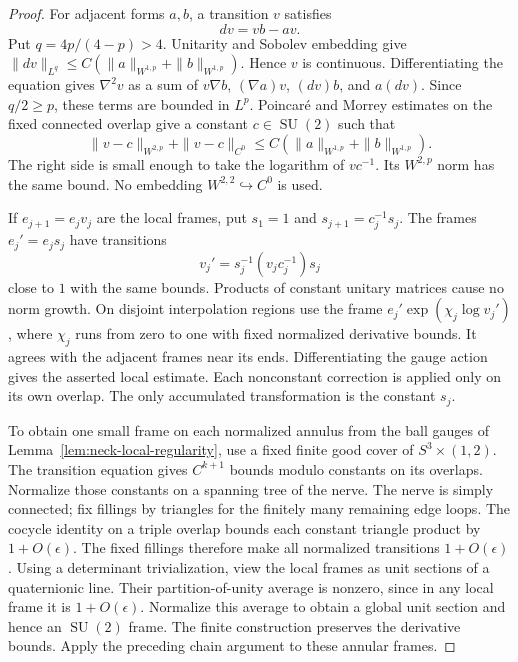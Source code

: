 \documentclass[11pt]{amsart}
\theoremstyle{definition}
\theoremstyle{remark}
\theoremstyle{plain}
\newcommand{\SU}{\operatorname{SU}}
\begin{document}
\begin{proof}
For adjacent forms $a,b$, a transition $v$ satisfies
\begin{equation}\label{eq:annular-transition-equation}
 dv=vb-av.
\end{equation}
Put $q=4p/(4-p)>4$.  Unitarity and Sobolev embedding give
$\|dv\|_{L^q}\le C(\|a\|_{W^{1,p}}+\|b\|_{W^{1,p}})$.
Hence $v$ is continuous.  Differentiating the equation gives
$\nabla^2v$ as a sum of $v\nabla b$, $(\nabla a)v$,
$(dv)b$, and $a(dv)$.  Since $q/2\ge p$, these terms are bounded
in $L^p$.  Poincar\'e and Morrey estimates on the fixed connected
overlap give a constant $c\in\SU(2)$ such that
\begin{equation}\label{eq:annular-transition-bound}
 \|v-c\|_{W^{2,p}}+\|v-c\|_{C^0}
 \le C(\|a\|_{W^{1,p}}+\|b\|_{W^{1,p}}).
\end{equation}
The right side is small enough to take the logarithm of $vc^{-1}$.
Its $W^{2,p}$ norm has the same bound.  No embedding
$W^{2,2}\hookrightarrow C^0$ is used.

If $e_{j+1}=e_jv_j$ are the local frames, put $s_1=1$ and
$s_{j+1}=c_j^{-1}s_j$.  The frames $e_j'=e_js_j$ have transitions
\[
 v_j'=s_j^{-1}(v_jc_j^{-1})s_j
\]
close to $1$ with the same bounds.  Products of constant unitary
matrices cause no norm growth.  On disjoint interpolation regions
use the frame $e_j'\exp(\chi_j\log v_j')$, where $\chi_j$ runs
from zero to one with fixed normalized derivative bounds.  It agrees
with the adjacent frames near its ends.  Differentiating the gauge
action gives the asserted local estimate.  Each nonconstant correction
is applied only on its own overlap.  The only accumulated transformation
is the constant $s_j$.

To obtain one small frame on each normalized annulus from the ball
gauges of Lemma~\ref{lem:neck-local-regularity}, use a fixed finite
good cover of $S^3\times(1,2)$.  The transition equation gives
$C^{k+1}$ bounds modulo constants on its overlaps.  Normalize those
constants on a spanning tree of the nerve.  The nerve is simply
connected; fix fillings by triangles for the finitely many remaining
edge loops.  The cocycle identity on a triple overlap bounds each
constant triangle product by $1+O(\epsilon)$.  The fixed fillings
therefore make all normalized transitions $1+O(\epsilon)$.
Using a determinant trivialization, view the local frames as unit
sections of a quaternionic line.  Their partition-of-unity average
is nonzero, since in any local frame it is $1+O(\epsilon)$.
Normalize this average to obtain a global unit section and hence an
$\SU(2)$ frame.  The finite construction preserves the derivative
bounds.  Apply the preceding chain argument to these annular frames.
\end{proof}
\end{document}
